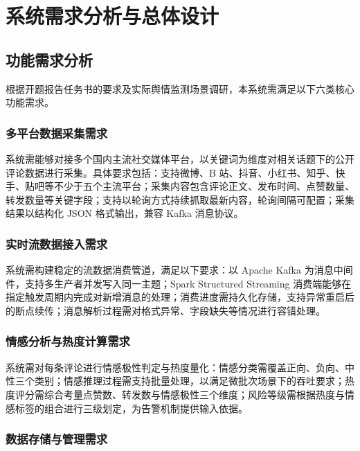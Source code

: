 
\chapter{系统需求分析与总体设计}

\section{功能需求分析}

根据开题报告任务书的要求及实际舆情监测场景调研，本系统需满足以下六类核心功能需求。

\subsection{多平台数据采集需求}

系统需能够对接多个国内主流社交媒体平台，以关键词为维度对相关话题下的公开评论数据进行采集。具体要求包括：支持微博、B 站、抖音、小红书、知乎、快手、贴吧等不少于五个主流平台；采集内容包含评论正文、发布时间、点赞数量、转发数量等关键字段；支持以轮询方式持续抓取最新内容，轮询间隔可配置；采集结果以结构化 JSON 格式输出，兼容 Kafka 消息协议。

\subsection{实时流数据接入需求}

系统需构建稳定的流数据消费管道，满足以下要求：以 Apache Kafka 为消息中间件，支持多生产者并发写入同一主题；Spark Structured Streaming 消费端能够在指定触发周期内完成对新增消息的处理；消费进度需持久化存储，支持异常重启后的断点续传；消息解析过程需对格式异常、字段缺失等情况进行容错处理。

\subsection{情感分析与热度计算需求}

系统需对每条评论进行情感极性判定与热度量化：情感分类需覆盖正向、负向、中性三个类别；情感推理过程需支持批量处理，以满足微批次场景下的吞吐要求；热度评分需综合考量点赞数、转发数与情感极性三个维度；风险等级需根据热度与情感标签的组合进行三级划定，为告警机制提供输入依据。

\subsection{数据存储与管理需求}

